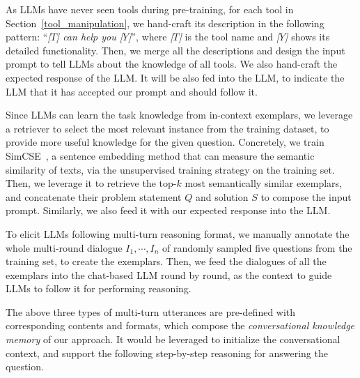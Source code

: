 As LLMs have never seen tools during pre-training, %
for each tool in Section~\ref{tool_manipulation}, we hand-craft its description in the following pattern: ``\emph{[$T$] can help you [$Y$]}'', where \emph{[$T$]} is the tool name and \emph{[$Y$]} shows its detailed functionality.
Then, we merge all the descriptions and design the input prompt to tell LLMs about the knowledge of all tools.
We also hand-craft the expected response of the LLM. It will be also fed into the LLM, to indicate the LLM that it has accepted our prompt and should follow it.

Since LLMs can learn the task knowledge from in-context exemplars, we leverage a retriever to select the most relevant instance from the training dataset, to provide more useful knowledge for the given question.
Concretely, we train SimCSE~\cite{SimCSE}, a sentence embedding method that can measure the semantic similarity of texts, via the unsupervised training strategy on the training set.
Then, we leverage it to retrieve the top-$k$ most semantically similar exemplars, and concatenate their problem statement $Q$ and solution $S$ to compose the input prompt.
Similarly, we also feed it with our expected response into the LLM. 

To elicit LLMs following multi-turn reasoning format, we manually annotate the whole multi-round dialogue $I_1, \cdots, I_n$ of randomly sampled five questions from the training set, to create the exemplars.
Then, we feed the dialogues of all the exemplars into the chat-based LLM round by round, as the context to guide LLMs to follow it for performing reasoning.

 The above three types of multi-turn utterances are pre-defined with corresponding contents and formats, which compose the \emph{conversational knowledge memory} of our approach.
It would be leveraged to initialize the conversational context, and support the following step-by-step reasoning for answering the question.


